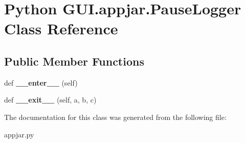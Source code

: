 \hypertarget{class_python_01_g_u_i_1_1appjar_1_1_pause_logger}{}\section{Python G\+U\+I.\+appjar.\+Pause\+Logger Class Reference}
\label{class_python_01_g_u_i_1_1appjar_1_1_pause_logger}
\subsection*{Public Member Functions}
\begin{DoxyCompactItemize}
\item 
\mbox{\label{class_python_01_g_u_i_1_1appjar_1_1_pause_logger_a2b9e75b6d51b5c33d5f98b297f2b63c8}} 
def {\bfseries \+\_\+\+\_\+enter\+\_\+\+\_\+} (self)
\item 
\mbox{\label{class_python_01_g_u_i_1_1appjar_1_1_pause_logger_adc708210954a796fdfb6fe2f63973244}} 
def {\bfseries \+\_\+\+\_\+exit\+\_\+\+\_\+} (self, a, b, c)
\end{DoxyCompactItemize}


The documentation for this class was generated from the following file\+:\begin{DoxyCompactItemize}
\item 
appjar.\+py\end{DoxyCompactItemize}
